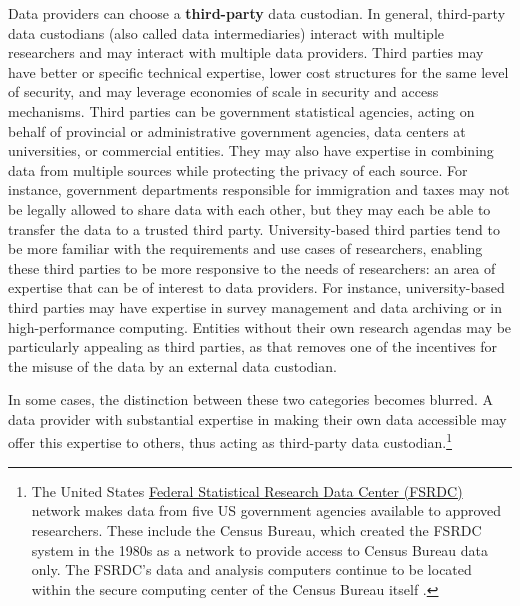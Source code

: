 Data providers can choose a \textbf{third-party} data custodian. In general, third-party data custodians (also called data intermediaries) interact with multiple researchers and may interact with multiple data providers. Third parties may have better or specific technical expertise, lower cost structures for the same level of security, and may leverage economies of scale in security and access mechanisms. Third parties can be government statistical agencies, acting on behalf of provincial or administrative government agencies, data centers at universities, or commercial entities. They may also have expertise in combining data from multiple sources while protecting the privacy of each source. For instance, government departments responsible for immigration and taxes may not be legally allowed to share data with each other, but they may each be able to transfer the data to a trusted third party. University-based third parties tend to be more familiar with the requirements and use cases of researchers, enabling these third parties to be more responsive to the needs of researchers: an area of expertise that can be of interest to data providers. For instance, university-based third parties may have expertise in survey management and data archiving or in high-performance computing. Entities without their own research agendas may be particularly appealing as third parties, as that removes one of the incentives for the misuse of the data by an external data custodian.

In some cases, the distinction between these two categories becomes blurred. A data provider with substantial expertise in making their own data accessible may offer this expertise to others, thus acting as third-party data custodian.\footnote{The United States \protect\hyperlink{federal-statistical-research-data-centers-fsrdc}{Federal Statistical Research Data Center (FSRDC)} network makes data from five US government agencies available to approved researchers. These include the Census Bureau, which created the FSRDC system in the 1980s as a network to provide access to Census Bureau data only. The FSRDC's data and analysis computers continue to be located within the secure computing center of the Census Bureau itself \citep{unitedstatescensusbureaua}.}

